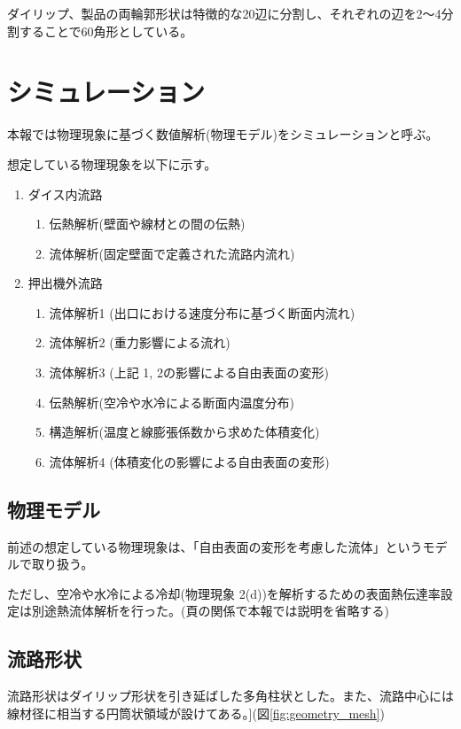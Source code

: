 \documentclass[report]{jlreq}
\begin{document}
ダイリップ、製品の両輪郭形状は特徴的な20辺に分割し、それぞれの辺を2～4分割することで60角形としている。

\newpage

\section{シミュレーション}
本報では物理現象に基づく数値解析({\small 物理モデル})をシミュレーションと呼ぶ。

想定している物理現象を以下に示す。

\begin{enumerate}
  \item ダイス内流路
  \begin{enumerate}
    \item 伝熱解析(壁面や線材との間の伝熱)
    \item 流体解析(固定壁面で定義された流路内流れ)
  \end{enumerate}
  \item 押出機外流路
  \begin{enumerate}
    \item 流体解析1 (出口における速度分布に基づく断面内流れ)
    \item 流体解析2 (重力影響による流れ)
    \item 流体解析3 (上記 1, 2の影響による自由表面の変形)
    \item 伝熱解析(空冷や水冷による断面内温度分布)
    \item 構造解析(温度と線膨張係数から求めた体積変化)
    \item 流体解析4 (体積変化の影響による自由表面の変形)
  \end{enumerate}
\end{enumerate}


\subsection{物理モデル}
前述の想定している物理現象は、「自由表面の変形を考慮した流体」というモデルで取り扱う。

ただし、空冷や水冷による冷却({\small 物理現象 2(d)})を解析するための表面熱伝達率設定は別途熱流体解析を行った。({\small 頁の関係で本報では説明を省略する})

\subsection{流路形状}
流路形状はダイリップ形状を引き延ばした多角柱状とした。また、流路中心には線材径に相当する円筒状領域が設けてある。]({\small 図\ref{fig:geometry_mesh}})
\end{document}
